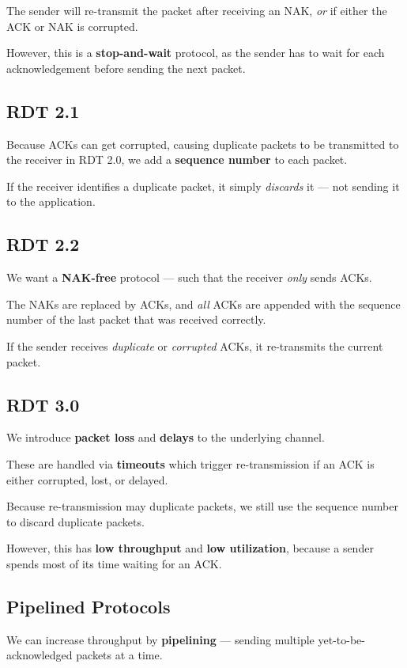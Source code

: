 The sender will re-transmit the packet after receiving an NAK, \textit{or} if either
the ACK or NAK is corrupted.

However, this is a \textbf{stop-and-wait} protocol, as the sender has to wait for each acknowledgement
before sending the next packet.

\subsection{RDT 2.1}
Because ACKs can get corrupted, causing duplicate packets to be transmitted to the receiver in RDT 2.0,
we add a \textbf{sequence number} to each packet.

If the receiver identifies a duplicate packet, it simply \textit{discards} it --- not sending it
to the application.

\subsection{RDT 2.2}
We want a \textbf{NAK-free} protocol --- such that the receiver \textit{only} sends ACKs.

The NAKs are replaced by ACKs, and \textit{all} ACKs are appended with the sequence number of the last
packet that was received correctly.

If the sender receives \textit{duplicate} or \textit{corrupted} ACKs, it re-transmits the current packet.

\subsection{RDT 3.0}
We introduce \textbf{packet loss} and \textbf{delays} to the underlying channel.

These are handled via \textbf{timeouts} which trigger re-transmission if an ACK is either
corrupted, lost, or delayed.

Because re-transmission may duplicate packets, we still use the sequence number to
discard duplicate packets.

However, this has \textbf{low throughput} and \textbf{low utilization},
because a sender spends most of its time waiting for an ACK.

\subsection{Pipelined Protocols}
We can increase throughput by \textbf{pipelining} --- sending multiple yet-to-be-acknowledged
packets at a time.

